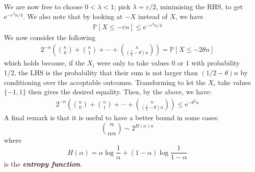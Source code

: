 \documentclass[]{article}
\theoremstyle{custhm}
\theoremstyle{cusdef}
\theoremstyle{custhm}
\theoremstyle{custhm}
\theoremstyle{custhm}
\theoremstyle{custhm}
\theoremstyle{cusdef}
\theoremstyle{remark}
\newcommand{\e}{\mathrm{e}}
\newcommand{\eps}{\varepsilon}
\renewcommand{\P}{\mathbb{P}}
\newcommand{\undf}[1]{\textit{\textbf{#1}}}
\begin{document}
We are now free to choose $0 < \lambda < 1$; pick $\lambda = \eps/2$, minimising the RHS, to get $\e^{-\eps^2 n/4}$. We also note that by looking at $-X$ instead of $X$, we have
\begin{align*}
\P[X\le -\eps n] \le \e^{-\eps^2n/4}
\end{align*}
We now consider the following
\begin{align*}
2^{-n}\left(\binom{n}{0} +\binom{n}{1}+\cdots+\binom{n}{\left(\frac{1}{2}-\theta\right)n}\right) = \P[X \le -2\theta n]
\end{align*}
which holds because, if the $X_i$ were only to take values $0$ or $1$ with probability 1/2, the LHS is the probability that their sum  is not larger than $(1/2 - \theta)n$ by conditioning over the acceptable outcomes. Transforming to let the $X_i$ take values $\{-1,1\}$ then gives the desired equality. Then, by the above, we have:
\begin{align*}
2^{-n}\left(\binom{n}{0} +\binom{n}{1}+\cdots+\binom{n}{\left(\frac{1}{2}-\theta\right)n}\right) \le \e^{-\theta^2 n}
\end{align*}
A final remark is that it is useful to have a better bound in some cases:
\[
\binom{n}{\alpha n} \sim 2^{H(\alpha)n}
\]
where
\[
H(\alpha) = \alpha \log \frac{1}{\alpha} + (1-\alpha)\log \frac{1}{1-\alpha}
\]
is the \undf{entropy function}.
\end{document}
